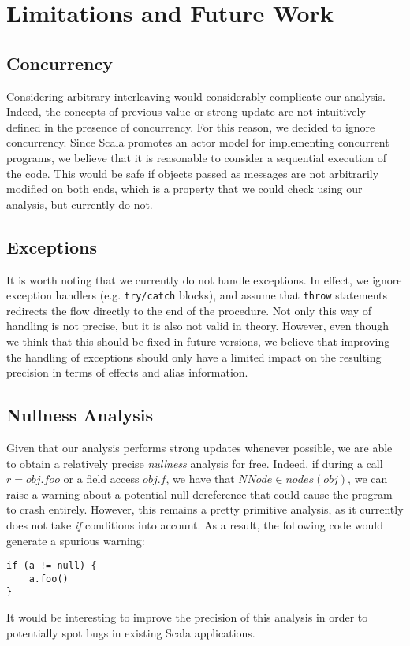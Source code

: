 \chapter{Limitations and Future Work}
\label{chap:conclusion}
\section{Concurrency}
Considering arbitrary interleaving would considerably complicate our analysis.
Indeed, the concepts of previous value or strong update are not intuitively
defined in the presence of concurrency. For this reason, we decided to ignore
concurrency. Since Scala promotes an actor model for implementing concurrent
programs, we believe that it is reasonable to consider a sequential execution
of the code. This would be safe if objects passed as messages are not
arbitrarily modified on both ends, which is a property that we could check
using our analysis, but currently do not.

\section{Exceptions}
It is worth noting that we currently do not handle exceptions. In effect, we
ignore exception handlers (e.g. \lstinline{try/catch} blocks), and assume that
\lstinline{throw} statements redirects the flow directly to the end of the
procedure. Not only this way of handling is not precise, but it is also not
valid in theory. However, even though we think that this should be fixed in
future versions, we believe that improving the handling of exceptions should
only have a limited impact on the resulting precision in terms of effects and
alias information.

\section{Nullness Analysis}
Given that our analysis performs strong updates whenever possible, we are able
to obtain a relatively precise \emph{nullness} analysis for free. Indeed, if during
a call $r = obj.foo$ or a field access $obj.f$, we have that $NNode \in
nodes(obj)$, we can raise a warning about a potential null dereference that
could cause the program to crash entirely. However, this remains a pretty
primitive analysis, as it currently does not take \emph{if} conditions into
account. As a result, the following code would generate a spurious warning:
\begin{lstlisting}
if (a != null) {
    a.foo()
}
\end{lstlisting}
It would be interesting to improve the precision of this analysis in order to
potentially spot bugs in existing Scala applications.

